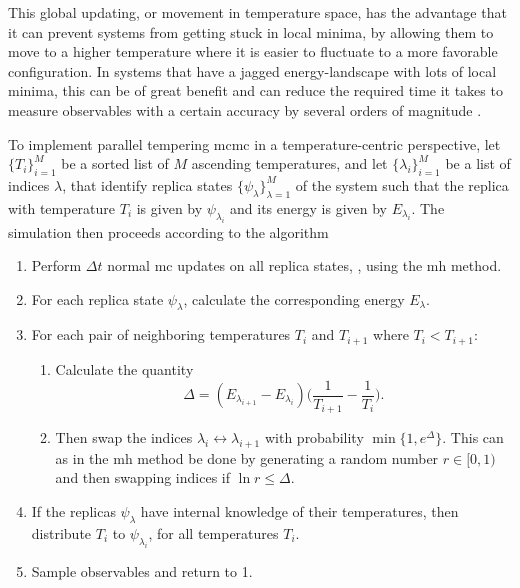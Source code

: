 This global updating, or movement in temperature space, has the advantage that it can prevent systems from getting stuck in local minima,
by allowing them to move to a higher temperature where it is easier to fluctuate to a more favorable configuration. In systems that
have a jagged energy-landscape with lots of local minima, this can be of great benefit and can reduce the required time it takes
to measure observables with a certain accuracy by several orders of magnitude \cite{Katzgraber09}.

To implement parallel tempering \ac{mcmc} in a temperature-centric perspective,
let $\{T_i\}_{i=1}^M$ be a sorted list of $M$ ascending temperatures, and let $\{\lambda_i\}_{i=1}^M$
be a list of indices $\lambda$, that identify replica states $\{\psi_\lambda\}_{\lambda=1}^M$ of the system such that the replica with temperature $T_i$
is given by $\psi_{\lambda_i}$ and its energy is given by $E_{\lambda_i}$.
The simulation then proceeds according to the algorithm
\begin{enumerate}
    \item Perform $\Delta t$ normal \ac{mc} updates on all replica states, \eg, using the \ac{mh} method.
    \item For each replica state $\psi_\lambda$, calculate the corresponding energy $E_\lambda$.
    \item For each pair of neighboring temperatures $T_i$ and $T_{i+1}$ where $T_i<T_{i+1}$:
        \begin{enumerate}
            \item Calculate the quantity
            \begin{equation}
                \label{eq:Monte:PT:delta}
                \Delta = (E_{\lambda_{i+1}} - E_{\lambda_i})\Big(\frac{1}{T_{i+1}} - \frac{1}{T_i}\Big).
            \end{equation}
            \item Then swap the indices $\lambda_i \leftrightarrow \lambda_{i+1}$ with probability $\min\{1, e^\Delta\}$. This can
                as in the \ac{mh} method be done by generating a random number $r\in[0,1)$ and then swapping indices if
                $\ln r \leq \Delta$.
        \end{enumerate}
    \item If the replicas $\psi_\lambda$ have internal knowledge of their temperatures, then distribute $T_i$ to $\psi_{\lambda_i}$, for all
        temperatures $T_i$.
    \item Sample observables and return to 1.
\end{enumerate}

